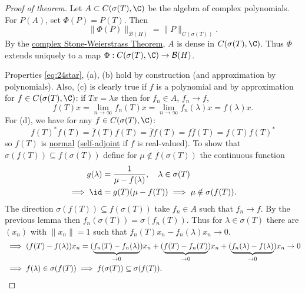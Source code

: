 \documentclass{article}
\begin{document}
\begin{proof}[Proof of theorem]
    Let $A \subset C(\sigma(T), \C)$ be the algebra of complex polynomials.
    For $P(A)$, set $\Phi(P) = P(T)$.  Then
    \begin{equation*}
        \|\Phi(P)\|_{\mathcal{B}(H)} = \|P\|_{C(\sigma(T))}.
    \end{equation*}
    By the \hyperlink{thm:csw}{complex Stone-Weierstrass Theorem}, $A$ is dense in $C(\sigma(T), \C)$.
    Thus $\Phi$ extends uniquely to a map $\Phi: C(\sigma(T), \C) \to \mathcal{B}(H)$.

    Properties \eqref{eq:24star}, (a), (b) hold by construction (and approximation by polynomials).
    Also, (c) is clearly true if $f$ is a polynomial and by approximation for $f \in C(\sigma(T), \C)$:
    if $Tx = \lambda x$ then for $f_n \in A$, $f_n \to f$,
    \begin{equation*}
        f(T) x = \lim_{n \to \infty} f_n(T) x = \lim_{n \to \infty} f_n(\lambda) x = f(\lambda) x.
    \end{equation*}
    For (d), we have for any $f \in C(\sigma(T), \C)$:
    \begin{equation*}
        f(T)^* f(T) = \overline{f}(T) f(T) = \overline{f}f(T) = f \overline{f}(T) = f(T) f(T)^*
    \end{equation*}
    so $f(T)$ is \hyperlink{def:normalMap}{normal} (\hyperlink{def:normalMap}{self-adjoint} if $f$ is real-valued).
    To show that $\sigma(f(T)) \subseteq f(\sigma(T))$ define for $\mu \notin f(\sigma(T))$ the continuous function
    \begin{align*}
        g(\lambda) &= \frac{1}{\mu - f(\lambda)}, \quad \lambda \in \sigma(T) \\
        \implies \id &= g(T) (\mu - f(T)) \implies \mu \notin \sigma(f(T)).
    \end{align*}
    The direction $\sigma(f(T)) \subseteq f(\sigma(T))$ take $f_n \in A$ such that $f_n \to f$.
    By the previous lemma then $f_n(\sigma(T)) = \sigma(f_n(T))$.
    Thus for $\lambda \in \sigma(T)$ there are $(x_n)$ with $\|x_n\| = 1$ such that $f_n(T) x_n - f_n(\lambda) x_n \to 0$.
    \begin{align*}
        &\implies (f(T) - f(\lambda)) x_n = (\underbrace{f_n(T) - f_n(\lambda)}_{\to 0}) x_n + (\underbrace{f(T) - f_n(T)}_{\to 0}) x_n + (\underbrace{f_n(\lambda) - f(\lambda)}_{\to 0}) x_n \to 0 \\
        &\implies f(\lambda) \in \sigma(f(T)) \implies f(\sigma(T)) \subseteq \sigma(f(T)). \qedhere
    \end{align*}
\end{proof}
\end{document}
